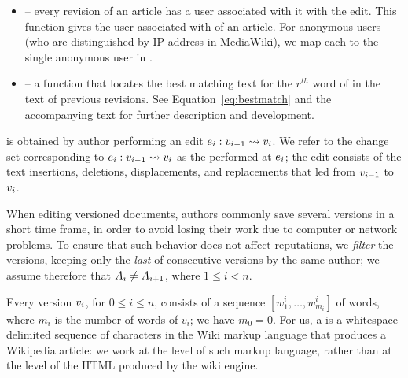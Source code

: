 \begin{itemize}
\item {} -- every revision of an article has
    a user associated with it with the edit.
    This function gives the user associated with  of
    an article.
    For anonymous users (who are distinguished by IP address in
    MediaWiki), we map each to the single anonymous user in \users.

\item {} -- a function
    that locates the best matching text for the $r^{th}$ word of
     in the text of previous revisions.
    See Equation~\ref{eq:bestmatch} and the accompanying text
    for further description and development.

\end{itemize}
\renewcommand{\labelitemi}{$\bullet$}


is obtained by author  performing an
edit $e_{i}: v_{i-1} \rightsquigarrow v_{i}$.
We refer to the change set corresponding to
$e_{i}: v_{i-1} \rightsquigarrow v_{i}$
as the  performed at $e_{i}$; the edit consists of the text
insertions, deletions, displacements, and replacements that led from
$v_{i-1}$ to $v_{i}$.

When editing versioned documents, authors commonly save several
versions in a short time frame, in order to avoid losing their work
due to computer or network problems.
To ensure that such behavior does not affect reputations, we
\textit{filter} the versions, keeping only the \textit{last} of consecutive
versions by the same author; we assume therefore that
$A_{i} \neq A_{i+1}$,
where $1 \leq i < n$.

Every version $v_{i}$, for $0 \leq i \leq n$, consists of a sequence
$[w^i_1, \ldots, w^i_{m_i}]$ of words, where $m_i$ is the number of
words of $v_i$; we have $m_0 = 0$.
For us, a  is a whitespace-delimited sequence of
characters in the Wiki markup language that produces a Wikipedia article:
we work at the level of such markup language, rather than at the level
of the HTML produced by the wiki engine.

